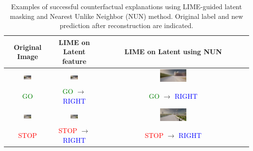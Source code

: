 \begin{table}[htbp]
\centering
\renewcommand{\arraystretch}{1.2}
\caption[LIME + NUN counterfactual examples]{Examples of successful counterfactual explanations using LIME-guided latent masking and Nearest Unlike Neighbor (NUN) method. Original label and new prediction after reconstruction are indicated.}
\label{tab:cf_nun_lime_examples}
\begin{tabular}{c|c|c}
\textbf{Original Image} & \textbf{LIME on Latent feature} & \textbf{LIME on Latent using NUN} \\
\toprule

\includegraphics[width=0.18\textwidth]{img/appendix/original_town7_011020.png} &
\includegraphics[width=0.18\textwidth]{img/appendix/latent_recon_town7_011020.png} &
\includegraphics[width=0.18\textwidth]{img/appendix/nun_recon_town7_011020.png} \\
\textcolor{green}{GO}  & 
\textcolor{green}{GO} $\rightarrow$ \textcolor{blue}{RIGHT} & 
\textcolor{green}{GO} $\rightarrow$ \textcolor{blue}{RIGHT} \\
\midrule

\includegraphics[width=0.18\textwidth]{img/appendix/original_town7_010880.png} &
\includegraphics[width=0.18\textwidth]{img/appendix/latent_recon_town7_010880.png} &
\includegraphics[width=0.18\textwidth]{img/appendix/nun_recon_town7_010880.png} \\
\textcolor{red}{STOP}  & 
\textcolor{red}{STOP} $\rightarrow$ \textcolor{blue}{RIGHT} & 
\textcolor{red}{STOP} $\rightarrow$ \textcolor{blue}{RIGHT} \\
\midrule


\end{tabular}
\end{table}

